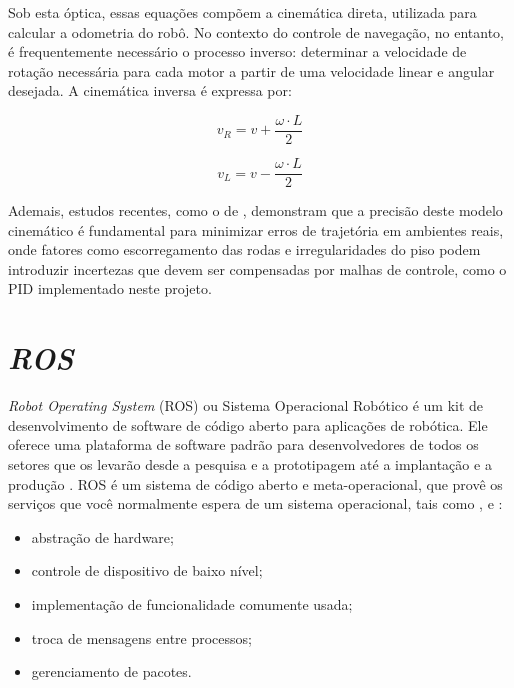 Sob esta óptica, essas equações compõem a cinemática direta, utilizada para calcular a odometria do robô. No contexto do controle de navegação, no entanto, é frequentemente necessário o processo inverso: determinar a velocidade de rotação necessária para cada motor a partir de uma velocidade linear e angular desejada. A cinemática inversa é expressa por:

\begin{equation}
    v_R = v + \frac{\omega \cdot L}{2}
    \label{eq:inversa_vr}
\end{equation}

\begin{equation}
    v_L = v - \frac{\omega \cdot L}{2}
    \label{eq:inversa_vl}
\end{equation}

Ademais, estudos recentes, como o de , demonstram que a precisão deste modelo cinemático é fundamental para minimizar erros de trajetória em ambientes reais, onde fatores como escorregamento das rodas e irregularidades do piso podem introduzir incertezas que devem ser compensadas por malhas de controle, como o PID implementado neste projeto.

\section{\textit{ROS}}

\textit{Robot Operating System} (ROS) ou Sistema Operacional Robótico é um kit de desenvolvimento de software de código aberto para aplicações de robótica. Ele oferece uma plataforma de software padrão para desenvolvedores de todos os setores que os levarão desde a pesquisa e a prototipagem até a implantação e a produção \cite{ROS.org}. ROS é um sistema de código aberto e meta-operacional, que provê os serviços que você normalmente espera de um sistema operacional, tais como ,  e :
\begin{itemize}
    \item abstração de hardware;
    \item controle de dispositivo de baixo nível;
    \item implementação de funcionalidade comumente usada;
    \item troca de mensagens entre processos;
    \item gerenciamento de pacotes.
\end{itemize}

